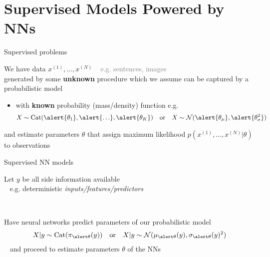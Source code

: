 \section{Supervised Models Powered by NNs}
\frame{\tableofcontents[currentsection]}

\begin{frame}{Supervised problems}

We have data $x^{(1)}, \ldots,  x^{(N)}$ \textcolor{gray}{~ e.g. sentences, images} \\
generated by some {\bf unknown} procedure 
which we assume can be captured by a probabilistic model


\begin{itemize}
	\item with {\bf known} probability (mass/density) function e.g.
	\begin{align*}
    X \sim \Cat(\alert{\theta_1}, \alert{\ldots}, \alert{\theta_K}) & & \text{or} & & X \sim \mathcal N(\alert{\theta_\mu}, \alert{\theta^2_\sigma})
    \end{align*}    
\end{itemize}
\pause
and \alert{estimate parameters $\theta$}  that assign maximum likelihood $p(x^{(1)}, \ldots, x^{(N)}|\theta)$ to observations

\end{frame}


\begin{frame}{Supervised NN models}

Let $y$ be all side information available\\
~ e.g. deterministic \emph{inputs/features/predictors}

~

Have neural networks predict parameters of our probabilistic model
	\begin{align*}
    X|y \sim \Cat(\pi_{\alert \theta}(y)) & & \text{or} & & X|y \sim \mathcal N(\mu_{\alert \theta}(y), \sigma_{\alert \theta}(y)^2)
    \end{align*}
~ and proceed to \alert{estimate parameters $\theta$}  of the NNs %



\end{frame}



